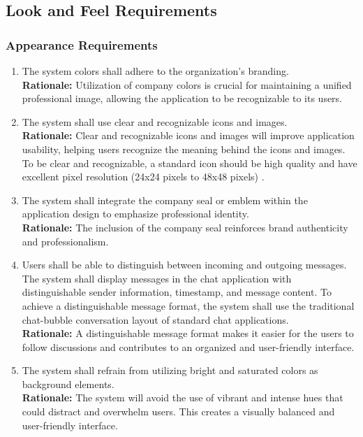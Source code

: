 \documentclass[]{article}
\begin{document}
\subsection{Look and Feel Requirements}
\label{sub:look_and_feel_requirements}   
\subsubsection{Appearance Requirements}
\label{ssub:appearance_requirements}
\begin{enumerate}[{LF-A}1. ]
    \item The system colors shall adhere to the organization's branding. \\
    {\bf Rationale:} Utilization of company colors is crucial for maintaining a unified professional image, allowing the application to be 
    recognizable to its users.
    \item The system shall use clear and recognizable icons and images. \\
    {\bf Rationale:} Clear and recognizable icons and images will improve application usability, helping users recognize the meaning behind
    the icons and images. To be clear and recognizable, a standard icon should be high quality and have excellent pixel resolution (24x24 pixels to 48x48 pixels)
    \cite{1c}.
    \item The system shall integrate the company seal or emblem within the application design to emphasize professional identity. \\
    {\bf Rationale:} The inclusion of the company seal reinforces brand authenticity and professionalism.
    \item Users shall be able to distinguish between incoming and outgoing messages. The system shall display messages in the chat application with distinguishable sender information, timestamp, and message content.  
    To achieve a distinguishable message format, the system shall use the traditional chat-bubble conversation layout of standard
    chat applications.\\
    {\bf Rationale:} A distinguishable message format makes it easier for the users to follow discussions and contributes to an organized and 
    user-friendly interface. 
    \item The system shall refrain from utilizing bright and saturated colors as background elements. \\
    {\bf Rationale:} The system will avoid the use of vibrant and intense hues that could distract and overwhelm users. This creates a 
    visually balanced and user-friendly interface.
\end{enumerate}
\end{document}

